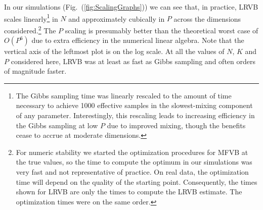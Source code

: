 \documentclass{article}\usepackage[]{graphicx}\usepackage[]{color}
\newcommand{\fig}[1]{Fig.~(\ref{fig:#1})}
\theoremstyle{plain}
\begin{document}
In our simulations (\fig{ScalingGraphs}) we can see that,
in practice, LRVB scales linearly\footnote{The Gibbs sampling time was linearly rescaled to the amount
of time necessary to achieve 1000 effective samples in the slowest-mixing
component of any parameter.  Interestingly, this rescaling
leads to increasing efficiency in the Gibbs sampling at low $P$ due
to improved mixing, though the benefits cease to accrue at moderate dimensions.}
 in $N$
and approximately cubically in $P$ across the dimensions considered.\footnote{For numeric stability
we started the optimization procedures for MFVB at the true
values, so the time to compute the optimum in our simulations
was very fast and not representative of practice.
On real data, the optimization time will depend on the
quality of the starting point.
Consequently, the times shown for LRVB are only the
times to compute the LRVB estimate.  The optimization times were
on the same order.}
The $P$ scaling is presumably better than the theoretical worst
case of $O(P^6)$ due to extra efficiency in the numerical linear algebra.
%
Note that the vertical axis of the leftmost plot is on the log scale.
At all the values of $N$, $K$ and $P$
considered here, LRVB was at least as fast as Gibbs sampling and
often orders of magnitude faster.
%
\end{document}
